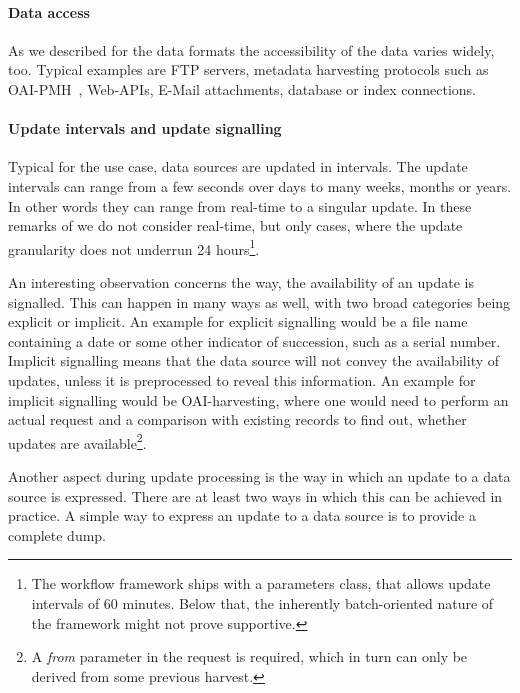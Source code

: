 \documentclass[english]{lni}
\begin{document}
\paragraph{Data access} As we described for the data formats the accessibility of the data varies widely, too.
Typical examples are FTP servers, metadata harvesting protocols such as
OAI-PMH~\cite{oai2008}, Web-APIs, E-Mail attachments, database or index
connections.

\paragraph{Update intervals and update signalling}
\label{updates}

Typical for the use case, data sources are updated in intervals.
The update intervals can range from a
few seconds over days to many weeks, months or years. In other words
they can range from real-time to a singular update.
In these remarks of we do not consider real-time, but only cases, where
the update granularity does not underrun 24 hours\footnote{The workflow
framework ships with a parameters class, that allows update intervals of 60 minutes. Below
that, the inherently batch-oriented nature of the framework might not prove supportive.}.

An interesting observation concerns the way, the availability of an update
is signalled. This can happen in many ways as well, with two broad categories being explicit or implicit.
An example for explicit signalling would be a file name containing a date
or some other indicator of succession, such as a serial number. Implicit
signalling means that the data source will not convey the
availability of updates, unless it is preprocessed to
reveal this information. An example for implicit signalling would be
OAI-harvesting, where one would need to perform an actual request and a
comparison with existing records to find out, whether updates are available\footnote{A \emph{from} parameter in the request is required, which in turn can only be derived from some previous harvest.}.

Another aspect during update processing is the way in which an update
to a data source is expressed. There are at least two ways in which this can be
achieved in practice. A simple way to express an update to a data source is to provide a complete dump.
\end{document}
